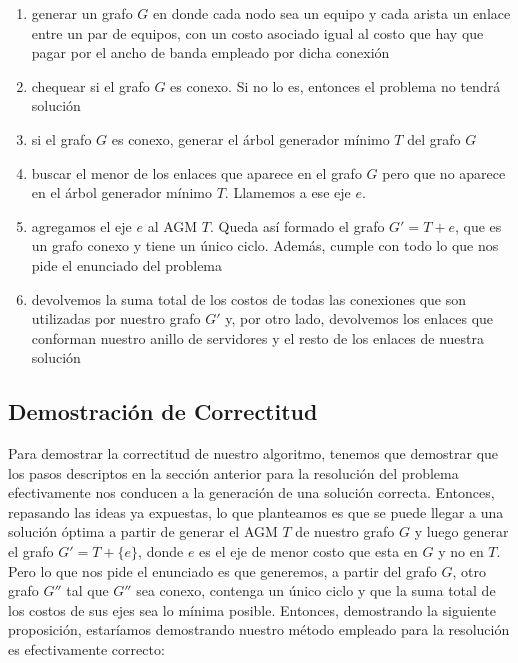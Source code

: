 \documentclass[11pt, a4paper, twoside]{article}
\begin{document}
\begin{enumerate}
  \item generar un grafo $G$ en donde cada nodo sea un equipo y cada arista un
        enlace entre un par de equipos, con un costo asociado igual al costo
        que hay que pagar por el ancho de banda empleado por dicha conexión
  \item chequear si el grafo $G$ es conexo. Si no lo es, entonces el problema
        no tendrá solución
  \item si el grafo $G$ es conexo, generar el árbol generador mínimo $T$ del grafo
        $G$
  \item buscar el menor de los enlaces que aparece en el grafo $G$ pero que no 
        aparece en el árbol generador mínimo $T$. Llamemos a ese eje $e$.
  \item agregamos el eje $e$ al AGM $T$. Queda así formado el grafo $G' = T + e$,
        que es un grafo conexo y tiene un único ciclo. Además, cumple con todo lo
        que nos pide el enunciado del problema
  \item devolvemos la suma total de los costos de todas las conexiones que son
        utilizadas por nuestro grafo $G'$ y, por otro lado, devolvemos los enlaces
        que conforman nuestro anillo de servidores y el resto de los enlaces 
        de nuestra solución
        
\end{enumerate}

\newpage
\subsection{Demostración de Correctitud}
Para demostrar la correctitud de nuestro algoritmo, tenemos que demostrar que los
pasos descriptos en la sección anterior para la resolución del problema 
efectivamente nos conducen a la generación de una solución correcta. Entonces,
repasando las ideas ya expuestas, lo que planteamos es que se puede llegar a una
solución óptima a partir de generar el AGM $T$ de nuestro grafo $G$ y luego generar
el grafo $G' = T + \{e\}$, donde $e$ es el eje de menor costo que esta en $G$ y
no en $T$. Pero lo que nos pide el enunciado es que generemos, a partir del grafo $G$,
otro grafo $G''$ tal que $G''$ sea conexo, contenga un único ciclo y que la suma
total de los costos de sus ejes sea lo mínima posible. Entonces, demostrando la 
siguiente proposición, estaríamos demostrando nuestro método empleado para la resolución
es efectivamente correcto:
\end{document}
